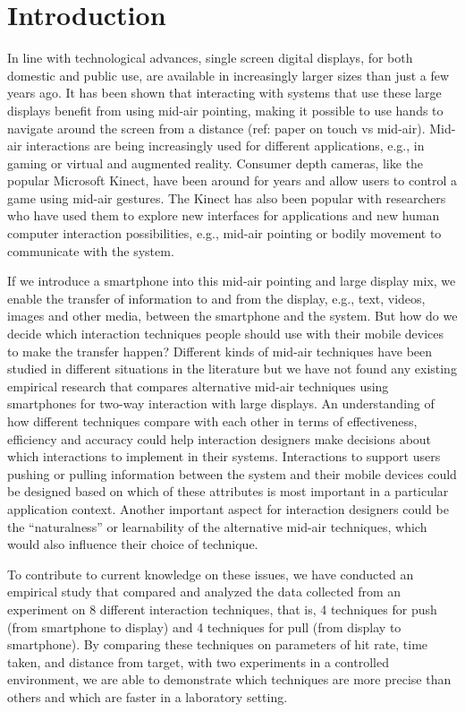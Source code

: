 \section{Introduction} \label{sec:introduction}
In line with technological advances, single screen digital displays, for both domestic and public use, are available in increasingly larger sizes than just a few years ago.
It has been shown that interacting with systems that use these large displays benefit from using mid-air pointing, making it possible to use hands to navigate around the screen from a distance (ref: paper on touch vs mid-air).
Mid-air interactions are being increasingly used for different applications, e.g., in gaming or virtual and augmented reality.
Consumer depth cameras, like the popular Microsoft Kinect, have been around for years and allow users to control a game using mid-air gestures.
The Kinect has also been popular with researchers who have used them to explore new interfaces for applications and new human computer interaction possibilities, e.g., mid-air pointing or bodily movement to communicate with the system.

If we introduce a smartphone into this mid-air pointing and large display mix, we enable the transfer of information to and from the display, e.g., text, videos, images and other media, between the smartphone and the system.
But how do we decide which interaction techniques people should use with their mobile devices to make the transfer happen? Different kinds of mid-air techniques have been studied in different situations in the literature but we have not found any existing empirical research that compares alternative mid-air techniques using smartphones for two-way interaction with large displays.
An understanding of how different techniques compare with each other in terms of effectiveness, efficiency and accuracy could help interaction designers make decisions about which interactions to implement in their systems.
Interactions to support users pushing or pulling information between the system and their mobile devices could be designed based on which of these attributes is most important in a particular application context.
Another important aspect for interaction designers could be the “naturalness” or learnability of the alternative mid-air techniques, which would also influence their choice of technique.

To contribute to current knowledge on these issues, we have conducted an empirical study that compared and analyzed the data collected from an experiment on 8 different interaction techniques, that is, 4 techniques for push (from smartphone to display) and 4 techniques for pull (from display to smartphone).
By comparing these techniques on parameters of hit rate, time taken, and distance from target, with two experiments in a controlled environment, we are able to demonstrate which techniques are more precise than others and which are faster in a laboratory setting.

